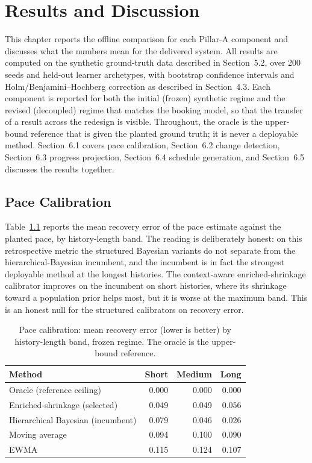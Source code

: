 \chapter{Results and Discussion}
This chapter reports the offline comparison for each Pillar-A component and discusses what the numbers mean for the delivered system. All results are computed on the synthetic ground-truth data described in Section~5.2, over 200 seeds and held-out learner archetypes, with bootstrap confidence intervals and Holm/Benjamini--Hochberg correction as described in Section~4.3. Each component is reported for both the initial (frozen) synthetic regime and the revised (decoupled) regime that matches the booking model, so that the transfer of a result across the redesign is visible. Throughout, the oracle is the upper-bound reference that is given the planted ground truth; it is never a deployable method. Section~6.1 covers pace calibration, Section~6.2 change detection, Section~6.3 progress projection, Section~6.4 schedule generation, and Section~6.5 discusses the results together.

\section{Pace Calibration}
Table~\ref{tab:res-cal} reports the mean recovery error of the pace estimate against the planted pace, by history-length band. The reading is deliberately honest: on this retrospective metric the structured Bayesian variants do not separate from the hierarchical-Bayesian incumbent, and the incumbent is in fact the strongest deployable method at the longest histories. The context-aware enriched-shrinkage calibrator improves on the incumbent on short histories, where its shrinkage toward a population prior helps most, but it is worse at the maximum band. This is an honest null for the structured calibrators on recovery error.

\begin{table}[htbp]
\centering
\footnotesize
\caption{Pace calibration: mean recovery error (lower is better) by history-length band, frozen regime. The oracle is the upper-bound reference.}
\label{tab:res-cal}
\begin{tabular}{l r r r}
\toprule
\textbf{Method} & \textbf{Short} & \textbf{Medium} & \textbf{Long} \\
\midrule
Oracle (reference ceiling) & 0.000 & 0.000 & 0.000 \\
Enriched-shrinkage (selected) & 0.049 & 0.049 & 0.056 \\
Hierarchical Bayesian (incumbent) & 0.079 & 0.046 & 0.026 \\
Moving average & 0.094 & 0.100 & 0.090 \\
EWMA & 0.115 & 0.124 & 0.107 \\
\bottomrule
\end{tabular}
\end{table}

